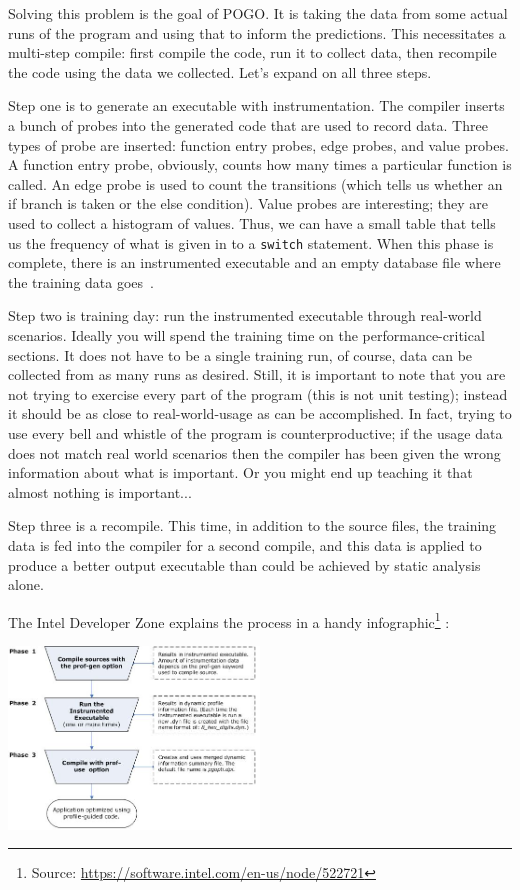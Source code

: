 \documentclass[a4paper]{report}
\begin{document}
Solving this problem is the goal of POGO. It is taking the data from some actual runs of the program and using that to inform the predictions. This necessitates a multi-step compile: first compile the code, run it to collect data, then recompile the code using the data we collected. Let's expand on all three steps.

Step one is to generate an executable with instrumentation. The compiler inserts a bunch of probes into the generated code that are used to record data. Three types of probe are inserted: function entry probes, edge probes, and value probes.  A function entry probe, obviously, counts how many times a particular function is called. An edge probe is used to count the transitions (which tells us whether an if branch is taken or the else condition). Value probes are interesting; they are used to collect a histogram of values. Thus, we can have a small table that tells us the frequency of what is given in to a \texttt{switch} statement. When this phase is complete, there is an instrumented executable and an empty database file where the training data goes~\cite{pogo}.

Step two is training day: run the instrumented executable through real-world scenarios. Ideally you will spend the training time on the performance-critical sections. It does not have to be a single training run, of course, data can be collected from as many runs as desired.   Still, it is important to note that you are not trying to exercise every part of the program (this is not unit testing); instead it should be as close to real-world-usage as can be accomplished. In fact, trying to use every bell and whistle of the program is counterproductive; if the usage data does not match real world scenarios then  the compiler has been given the wrong information about what is important. Or you might end up teaching it that almost nothing is important...

Step three is a recompile. This time, in addition to the source files, the training data is fed into the compiler for a second compile, and this data is applied to produce a better output executable than could be achieved by static analysis alone.

The Intel Developer Zone explains the process in a handy infographic\footnote{Source: \url{https://software.intel.com/en-us/node/522721}} :

\begin{center}
	\includegraphics[width=0.5\textwidth]{images/pogo-workflow.jpg}
\end{center}
\end{document}
